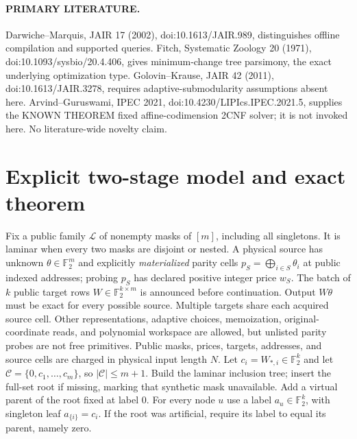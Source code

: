 \documentclass[11pt]{article}
\newcommand{\F}{\mathbb F_2}
\begin{document}
\paragraph{PRIMARY LITERATURE.} Darwiche--Marquis, JAIR 17 (2002), doi:10.1613/JAIR.989, distinguishes offline compilation and supported queries. Fitch, Systematic Zoology 20 (1971), doi:10.1093/sysbio/20.4.406, gives minimum-change tree parsimony, the exact underlying optimization type. Golovin--Krause, JAIR 42 (2011), doi:10.1613/JAIR.3278, requires adaptive-submodularity assumptions absent here. Arvind--Guruswami, IPEC 2021, doi:10.4230/LIPIcs.IPEC.2021.5, supplies the KNOWN THEOREM fixed affine-codimension 2CNF solver; it is not invoked here. No literature-wide novelty claim.

\section{Explicit two-stage model and exact theorem}
Fix a public family $\mathcal L$ of nonempty masks of $[m]$, including all singletons. It is laminar when every two masks are disjoint or nested. A physical source has unknown $\theta\in\F^m$ and explicitly \emph{materialized} parity cells $p_S=\bigoplus_{i\in S}\theta_i$ at public indexed addresses; probing $p_S$ has declared positive integer price $w_S$. The batch of $k$ public target rows $W\in\F^{k\times m}$ is announced before continuation. Output $W\theta$ must be exact for every possible source. Multiple targets share each acquired source cell. Other representations, adaptive choices, memoization, original-coordinate reads, and polynomial workspace are allowed, but unlisted parity probes are not free primitives. Public masks, prices, targets, addresses, and source cells are charged in physical input length $N$.
Let $c_i=W_{*,i}\in\F^k$ and let $\mathcal C=\{0,c_1,\ldots,c_m\}$, so $|\mathcal C|\le m+1$. Build the laminar inclusion tree; insert the full-set root if missing, marking that synthetic mask unavailable. Add a virtual parent of the root fixed at label $0$. For every node $u$ use a label $a_u\in\F^k$, with singleton leaf $a_{\{i\}}=c_i$. If the root was artificial, require its label to equal its parent, namely zero.
\end{document}
